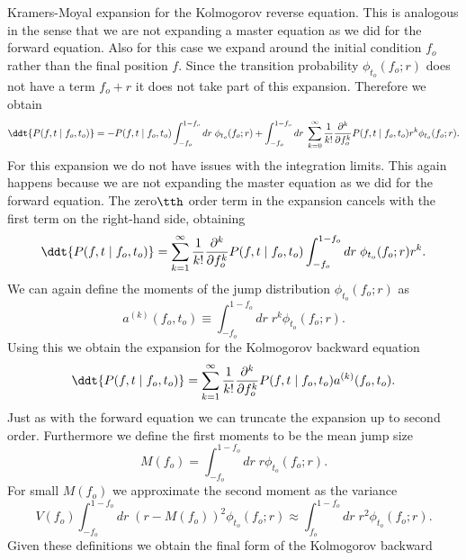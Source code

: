 Kramers-Moyal expansion for the Kolmogorov reverse equation. This is analogous
in the sense that we are not expanding a master equation as we did for the
forward equation. Also for this case we expand around the initial condition
$f_o$ rather than the final position $f$. Since the transition probability
$\phi_{t_o}(f_o; r)$ does not have a term $f_o + r$ it does not take part of
this expansion. Therefore we obtain
\begin{equation}
	\ddt{P(f, t \mid f_o, t_o)} =
	- P(f, t \mid f_o, t_o) \int_{- f_o}^{1 - f_o} dr \; \phi_{t_o}(f_o; r)
	+ \int_{-f_o}^{1 - f_o} dr\; \sum_{k=0}^{\infty} {1 \over k!}
	{\partial^k \over \partial f_o^k} P(f, t \mid f_o, t_o) r^k
	\phi_{t_o}(f_o; r).
\end{equation}
For this expansion we do not have issues with the integration limits. This again
happens because we are not expanding the master equation as we did for the
forward equation. The zero$\tth$ order term in the expansion cancels with the
first term on the right-hand side, obtaining
\begin{equation}
	\ddt{P(f, t \mid f_o, t_o)} =
	\sum_{k = 1}^{\infty} {1 \over k!} {\partial^k \over \partial f_o^k}
	P(f, t \mid f_o, t_o) \int_{-f_o}^{1 - f_o} dr\; \phi_{t_o}(f_o; r) r^k.
\end{equation}
We can again define the moments of the jump distribution $\phi_{t_o}(f_o; r)$ as
\begin{equation}
	a^{(k)}(f_o, t_o) \equiv \int_{-f_o}^{1 - f_o} dr \;
	r^k \phi_{t_o}(f_o; r).
\end{equation}
Using this we obtain the  expansion for the Kolmogorov backward equation
\begin{equation}
	\ddt{P(f, t \mid f_o, t_o)} =
	\sum_{k = 1}^{\infty} {1 \over k!} {\partial^k \over \partial f_o^k}
	P(f, t \mid f_o, t_o) a^{(k)}(f_o, t_o).
\end{equation}
Just as with the forward equation we can truncate the expansion up to second
order. Furthermore we define the first moments to be the mean jump size
\begin{equation}
	M(f_o) = \int_{-f_o}^{1 - f_o} dr \; r \phi_{t_o}(f_o; r).
\end{equation}
For small $M(f_o)$ we approximate the second moment as the variance
\begin{equation}
	V(f_o) \int_{-f_o}^{1 - f_o} dr \;
	(r - M(f_o))^2 \phi_{t_o}(f_o; r) \approx
	\int_{f_o}^{1 - f_o} dr \; r^2 \phi_{t_o}(f_o; r).
\end{equation}
Given these definitions we obtain the final form of the Kolmogorov backward

